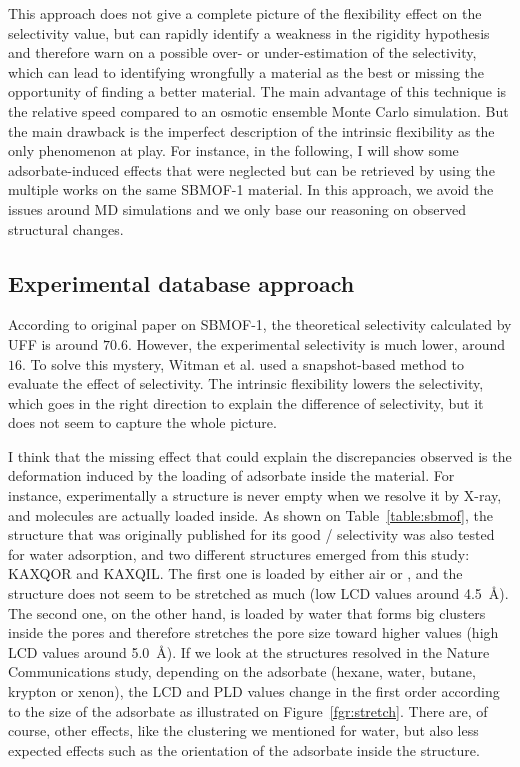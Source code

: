 \documentclass[main]{subfiles}
\begin{document}
This approach does not give a complete picture of the flexibility effect on the selectivity value, but can rapidly identify a weakness in the rigidity hypothesis and therefore warn on a possible over- or under-estimation of the selectivity, which can lead to identifying wrongfully a material as the best or missing the opportunity of finding a better material. The main advantage of this technique is the relative speed compared to an osmotic ensemble Monte Carlo simulation.\autocite{Bousquet2012} But the main drawback is the imperfect description of the intrinsic flexibility as the only phenomenon at play. For instance, in the following, I will show some adsorbate-induced effects that were neglected but can be retrieved by using the multiple works on the same SBMOF-1 material. In this approach, we avoid the issues around MD simulations and we only base our reasoning on observed structural changes. 


\subsection{Experimental database approach}

According to original paper on SBMOF-1,\autocite{Banerjee_2016} the theoretical selectivity calculated by UFF is around $70.6$. However, the experimental selectivity is much lower, around $16$. To solve this mystery, Witman et al. used a snapshot-based method to evaluate the effect of selectivity. The intrinsic flexibility lowers the selectivity, which goes in the right direction to explain the difference of selectivity, but it does not seem to capture the whole picture. 

I think that the missing effect that could explain the discrepancies observed is the deformation induced by the loading of adsorbate inside the material. For instance, experimentally a structure is never empty when we resolve it by X-ray, and molecules are actually loaded inside. As shown on Table~\ref{table:sbmof}, the structure that was originally published for its good / selectivity\autocite{Yeh2012,Banerjee2012} was also tested for water adsorption, and two different structures emerged from this study: KAXQOR and KAXQIL. The first one is loaded by either air or , and the structure does not seem to be stretched as much (low LCD values around \SI{4.5}{\angstrom}). The second one, on the other hand, is loaded by water that forms big clusters inside the pores and therefore stretches the pore size toward higher values (high LCD values around \SI{5.0}{\angstrom}). If we look at the structures resolved in the Nature Communications study\autocite{Banerjee_2016}, depending on the adsorbate (hexane, water, butane, krypton or xenon), the LCD and PLD values change in the first order according to the size of the adsorbate as illustrated on Figure~\ref{fgr:stretch}. There are, of course, other effects, like the clustering we mentioned for water, but also less expected effects such as the orientation of the adsorbate inside the structure. 
\end{document}
